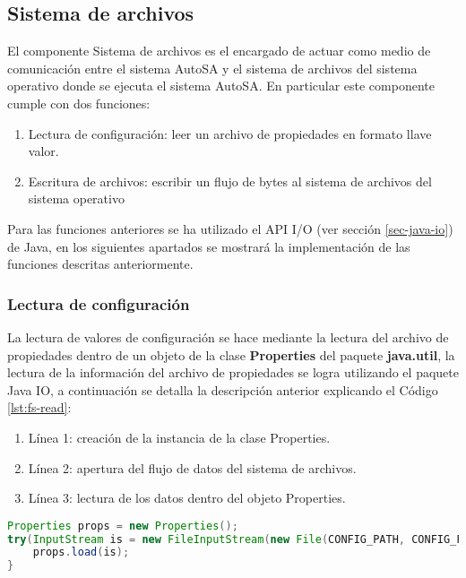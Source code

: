 \subsection{Sistema de archivos}
El componente Sistema de archivos es el encargado de actuar como medio de comunicación entre el sistema AutoSA y el sistema de archivos del sistema operativo donde se ejecuta el sistema AutoSA. En particular este componente cumple con dos funciones:
\begin{enumerate}
	\item Lectura de configuración: leer un archivo de propiedades en formato llave valor.
	\item Escritura de archivos: escribir un flujo de bytes al sistema de archivos del sistema operativo
\end{enumerate}
Para las funciones anteriores se ha utilizado el API I/O (ver sección \ref{sec-java-io}) de Java, en los siguientes apartados se mostrará la implementación de las funciones descritas anteriormente.

\subsubsection{Lectura de configuración}
La lectura de valores de configuración se hace mediante la lectura del archivo de propiedades dentro de un objeto de la clase \textbf{Properties} del paquete \textbf{java.util}, la lectura de la información del archivo de propiedades se logra utilizando el paquete Java IO, a continuación se detalla la descripción anterior explicando el Código \ref{lst:fs-read}:

\begin{enumerate}
 	\item Línea 1: creación de la instancia de la clase Properties.
 	\item Línea 2: apertura del flujo de datos del sistema de archivos.
 	\item Línea 3: lectura de los datos dentro del objeto Properties.
 \end{enumerate}

\begin{lstlisting}[language=Java, caption={Lectura de un archivo de propiedades.}, captionpos=b, label={lst:fs-read}]
Properties props = new Properties();
try(InputStream is = new FileInputStream(new File(CONFIG_PATH, CONFIG_FILENAME));){
	props.load(is);
}
\end{lstlisting}

